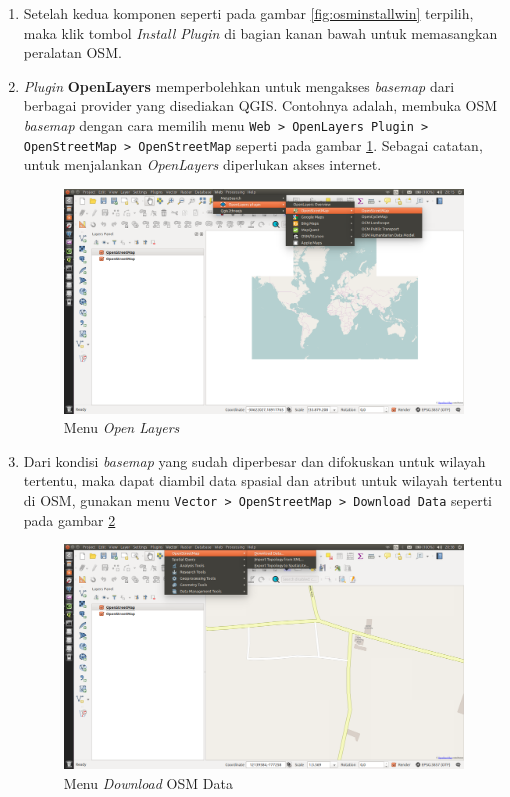 \begin{enumerate}[1.]
  \item Setelah kedua komponen seperti pada gambar \ref{fig:osminstallwin} terpilih, maka klik tombol \textit{Install Plugin} di bagian kanan bawah untuk memasangkan peralatan OSM.
  
  \item \textit{Plugin} \textbf{OpenLayers} memperbolehkan untuk mengakses \textit{basemap} dari berbagai provider yang disediakan QGIS. Contohnya adalah, membuka OSM \textit{basemap} dengan cara memilih menu \texttt{Web > OpenLayers Plugin > OpenStreetMap > OpenStreetMap} seperti pada gambar \ref{fig:osmmenu}. Sebagai catatan, untuk menjalankan \textit{OpenLayers} diperlukan akses internet.
  
  \begin{figure}[H]
    \centering
    \includegraphics[width=1\textwidth]{./resources/003-osm-plugin-menu}
    \caption{Menu \textit{Open Layers}}
    \label{fig:osmmenu}
  \end{figure}
  
  \item Dari kondisi \textit{basemap} yang sudah diperbesar dan difokuskan untuk wilayah tertentu, maka dapat diambil data spasial dan atribut untuk wilayah tertentu di OSM, gunakan menu \texttt{Vector > OpenStreetMap > Download Data} seperti pada gambar \ref{fig:downloadosmmenu}
  
  \begin{figure}[H]
    \centering
    \includegraphics[width=1\textwidth]{./resources/004-download-osm-menu}
    \caption{Menu \textit{Download} OSM Data}
    \label{fig:downloadosmmenu}
  \end{figure}
\end{enumerate}